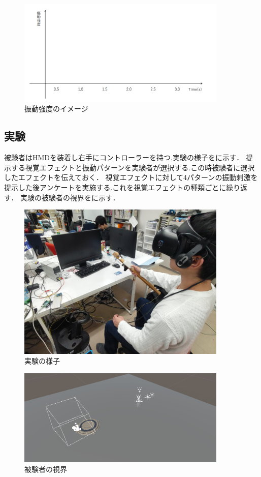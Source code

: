\begin{figure}[h]
\centering
\includegraphics[clip,width=10cm]{./fig/ank.png}
\caption{振動強度のイメージ}\label{ank}
\end{figure}

\subsection{実験}
被験者はHMDを装着し右手にコントローラーを持つ.実験の様子をに示す．
提示する視覚エフェクトと振動パターンを実験者が選択する.この時被験者に選択したエフェクトを伝えておく．
視覚エフェクトに対して4パターンの振動刺激を提示した後アンケートを実施する.これを視覚エフェクトの種類ごとに繰り返す．
実験の被験者の視界をに示す．

\begin{figure}[h]
\centering
\includegraphics[clip,width=10cm]{./fig/jikken.JPG}
\caption{実験の様子}\label{jikken}
\end{figure}


\begin{figure}[h]
\centering
\includegraphics[clip,width=10cm]{./fig/unity_first.png}
\caption{被験者の視界}\label{first}
\end{figure}


